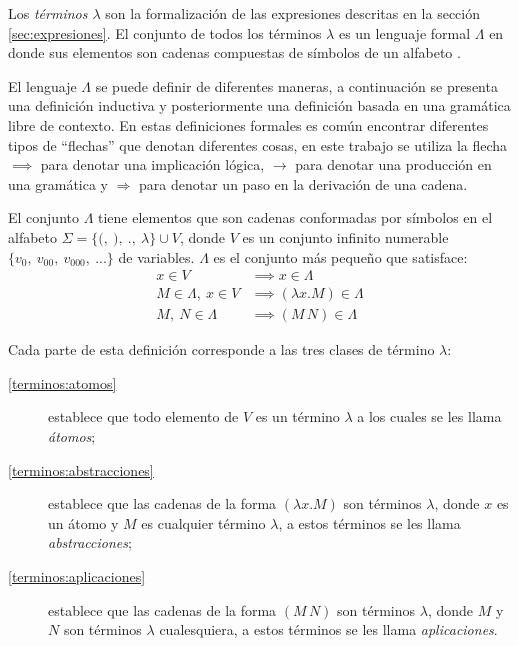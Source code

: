 Los \emph{términos \( λ \)} son la formalización de las expresiones descritas en la sección \ref{sec:expresiones}. El conjunto de todos los términos \( λ \) es un lenguaje formal \( Λ \) en donde sus elementos son cadenas compuestas de símbolos de un alfabeto \cite{Hopcroft:Automata}.

El lenguaje \( Λ \) se puede definir de diferentes maneras, a continuación se presenta una definición inductiva y posteriormente una definición basada en una gramática libre de contexto. En estas definiciones formales es común encontrar diferentes tipos de ``flechas'' que denotan diferentes cosas, en este trabajo se utiliza la flecha \( \implies \) para denotar una implicación lógica, \( \longrightarrow \) para denotar una producción en una gramática y \( \Rightarrow \) para denotar un paso en la derivación de una cadena.

\begin{defn}[Términos \( λ \)]
  El conjunto \( Λ \) tiene elementos que son cadenas conformadas por símbolos en el alfabeto \( Σ=\{\mathtt{(},\ \mathtt{)},\ \mathtt{.},\ λ\} \cup V \), donde \( V \) es un conjunto infinito numerable \( \{v_{0},\ v_{00},\ v_{000},\ ... \} \) de variables. \( Λ \) es el conjunto más pequeño que satisface:
  \label{defn:terminos}
  \begin{subequations}
    \begin{align}
      \label{terminos:atomos}
      x \in V & \implies x \in Λ \\
      \label{terminos:abstracciones}
      M \in Λ,\ x \in V & \implies (λx.M) \in Λ \\
      \label{terminos:aplicaciones}
      M,\ N \in Λ & \implies (M\, N) \in Λ
    \end{align}
  \end{subequations}
\end{defn}

Cada parte de esta definición corresponde a las tres clases de término \( λ \):

\begin{description}
\item[\eqref{terminos:atomos}] establece que todo elemento de \( V \) es un término \( λ \) a los cuales se les llama \emph{átomos};
\item[\eqref{terminos:abstracciones}] establece que las cadenas de la forma \( (λx.M) \) son términos \( λ \), donde \( x \) es un átomo y \( M \) es cualquier término \( λ \), a estos términos se les llama \emph{abstracciones};
\item[\eqref{terminos:aplicaciones}] establece que las cadenas de la forma \( (M\, N) \) son términos \( λ \), donde \( M \) y \( N \) son términos \( λ \) cualesquiera, a estos términos se les llama \emph{aplicaciones}.
\end{description}

